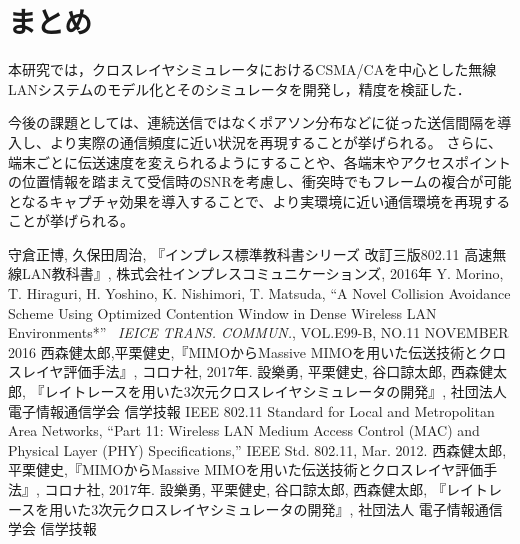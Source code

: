 \documentclass[a4paper,10pt]{ltjsarticle}
\begin{document}
\clearpage
\section{まとめ}

本研究では，クロスレイヤシミュレータにおけるCSMA/CAを中心とした無線LANシステムのモデル化とそのシミュレータを開発し，精度を検証した．

今後の課題としては、連続送信ではなくポアソン分布などに従った送信間隔を導入し、より実際の通信頻度に近い状況を再現することが挙げられる。
さらに、端末ごとに伝送速度を変えられるようにすることや、各端末やアクセスポイントの位置情報を踏まえて受信時のSNRを考慮し、衝突時でもフレームの複合が可能となるキャプチャ効果を導入することで、より実環境に近い通信環境を再現することが挙げられる。



\clearpage
{}
\begin{thebibliography}{99}

守倉正博, 久保田周治, 『インプレス標準教科書シリーズ 改訂三版802.11 高速無線LAN教科書』, 株式会社インプレスコミュニケーションズ, 2016年
Y. Morino, T. Hiraguri, H. Yoshino, K. Nishimori, T. Matsuda, ``A Novel Collision Avoidance Scheme Using Optimized Contention Window in Dense Wireless LAN Environments*'' \, \textit{IEICE TRANS. COMMUN.}, VOL.E99-B, NO.11 NOVEMBER 2016
西森健太郎,平栗健史,『MIMOからMassive MIMOを用いた伝送技術とクロスレイヤ評価手法』, コロナ社, 2017年.
設樂勇, 平栗健史, 谷口諒太郎, 西森健太郎, 『レイトレースを用いた3次元クロスレイヤシミュレータの開発』, 社団法人 電子情報通信学会 信学技報
IEEE 802.11 Standard for Local and Metropolitan Area
Networks, “Part 11: Wireless LAN Medium Access Control (MAC) and Physical Layer (PHY) Speciﬁcations,”  IEEE Std. 802.11, Mar. 2012.
西森健太郎,平栗健史,『MIMOからMassive MIMOを用いた伝送技術とクロスレイヤ評価手法』, コロナ社, 2017年.
設樂勇, 平栗健史, 谷口諒太郎, 西森健太郎, 『レイトレースを用いた3次元クロスレイヤシミュレータの開発』, 社団法人 電子情報通信学会 信学技報
\end{thebibliography}
\end{document}
